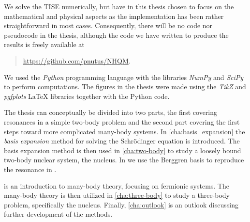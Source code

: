 \documentclass[../main/report.tex]{subfiles}
\begin{document}
We solve the TISE numerically, but have in this thesis chosen to focus on the mathematical and physical aspects as the implementation has been rather straightforward in most cases.
Consequently, there will be no code nor pseudocode in the thesis, although the code we have written to produce the results is freely available at
\begin{quote}
  \url{https://github.com/pnutus/NHQM}.
\end{quote}
We used the \emph{Python} programming language with the libraries \emph{NumPy} and \emph{SciPy} to perform computations. 
The figures in the thesis were made using the \emph{TikZ} and \emph{pgfplots} LaTeX libraries together with the Python code.

The thesis can conceptually be divided into two parts, the first covering resonances in a simple two-body problem and the second part covering the first steps toward more complicated many-body systems. 
In \cref{cha:basis_expansion} the \emph{basis expansion} method for solving the Schrödinger equation is introduced.
The basis expansion method is then used in \cref{cha:two-body} to study a loosely bound two-body nuclear system, the  nucleus.
In  we use the Berggren basis to reproduce the resonance in .

 is an introduction to many-body theory, focusing on fermionic systems. 
The many-body theory is then utilized in \cref{cha:three-body} 
to study a three-body problem, specifically the  nucleus.  
Finally, \cref{cha:outlook} is an outlook discussing further development of the methods.
\end{document}
